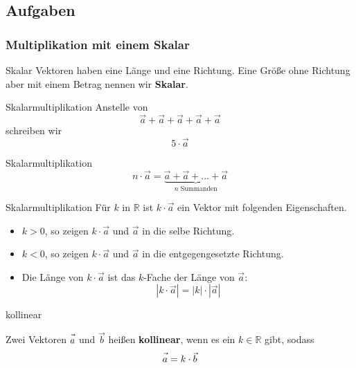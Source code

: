 \subsection*{Aufgaben}
\newpage


\subsubsection{Multiplikation mit einem Skalar}
\begin{definition}{Skalar}{}
  Vektoren haben eine Länge und eine Richtung. Eine Größe ohne
  Richtung aber mit einem Betrag nennen wir \textbf{Skalar}. 
\end{definition}

\begin{beispiel}{Skalarmultiplikation}{}
  Anstelle von
  $$\vec{a}+\vec{a}+\vec{a}+\vec{a}+\vec{a}$$
  schreiben wir
  $$5\cdot{}\vec{a}$$
\end{beispiel}

\begin{definition}{Skalarmultiplikation}{}
  $$n\cdot{}\vec{a} = \underbrace{\vec{a} + \vec{a} + ... + \vec{a}}_{n \textrm{ Summanden}}$$
\end{definition}

\begin{definition}{Skalarmultiplikation}{}
  Für $k$ in $\mathbb{R}$ ist $k\cdot{}\vec{a}$ ein Vektor mit
  folgenden Eigenschaften.

  \begin{itemize}
  \item $k>0$, so zeigen $k\cdot{}\vec{a}$ und $\vec{a}$ in die selbe Richtung.
  \item $k<0$, so zeigen $k\cdot{}\vec{a}$ und $\vec{a}$ in die entgegengesetzte Richtung.
  \item Die Länge von $k\cdot{}\vec{a}$ ist das $k$-Fache der Länge
    von $\vec{a}$: $$|k\cdot{}\vec{a}| = |k|\cdot{}|\vec{a}|$$
   \end{itemize}
\end{definition}

\begin{definition}{kollinear}{}\label{linearkombination}

  Zwei Vektoren $\vec{a\vphantom{b}}$ und $\vec{b}$ heißen \textbf{kollinear}, wenn es ein
  $k\in\mathbb{R}$ gibt, sodass
  $$\vec{a\vphantom{b}} = k\cdot{}\vec{b}$$
  \end{definition}

